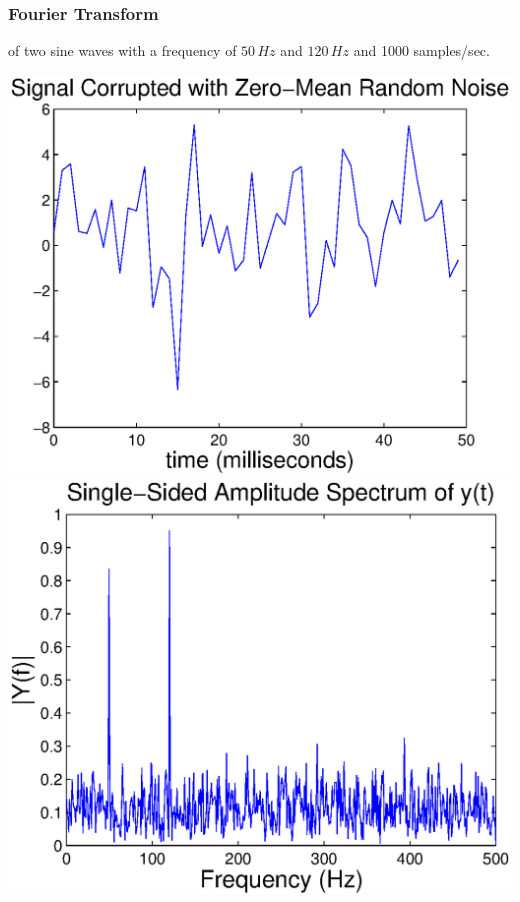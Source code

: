 \begin{frame}
    \frametitle{Fourier Transform}
    \myExample of two sine waves with a frequency of $50\,Hz$ and $120\,Hz$ and 1000 samples/sec.\newline

    \begin{center}
        \includegraphics[height=.65\textheight ]{images/fourier1N}\includegraphics[height=.65\textheight ]{images/fourier2N}
    \end{center}
\end{frame}




